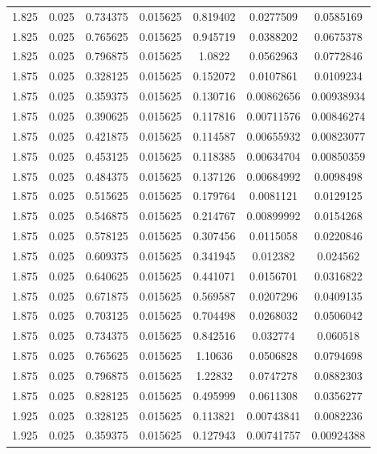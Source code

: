 \begin{table}[bh]
\begin{center}
{\begin{tabular}{ccccccc}
1.825	 & 0.025 & 	0.734375	 & 0.015625	 & 0.819402	 & 0.0277509	 & 0.0585169 \\ 
1.825	 & 0.025 & 	0.765625	 & 0.015625	 & 0.945719	 & 0.0388202	 & 0.0675378 \\ 
1.825	 & 0.025 & 	0.796875	 & 0.015625	 & 1.0822	 & 0.0562963	 & 0.0772846 \\ 
1.875	 & 0.025 & 	0.328125	 & 0.015625	 & 0.152072	 & 0.0107861	 & 0.0109234 \\ 
1.875	 & 0.025 & 	0.359375	 & 0.015625	 & 0.130716	 & 0.00862656	 & 0.00938934 \\ 
1.875	 & 0.025 & 	0.390625	 & 0.015625	 & 0.117816	 & 0.00711576	 & 0.00846274 \\ 
1.875	 & 0.025 & 	0.421875	 & 0.015625	 & 0.114587	 & 0.00655932	 & 0.00823077 \\ 
1.875	 & 0.025 & 	0.453125	 & 0.015625	 & 0.118385	 & 0.00634704	 & 0.00850359 \\ 
1.875	 & 0.025 & 	0.484375	 & 0.015625	 & 0.137126	 & 0.00684992	 & 0.0098498 \\ 
1.875	 & 0.025 & 	0.515625	 & 0.015625	 & 0.179764	 & 0.0081121	 & 0.0129125 \\ 
1.875	 & 0.025 & 	0.546875	 & 0.015625	 & 0.214767	 & 0.00899992	 & 0.0154268 \\ 
1.875	 & 0.025 & 	0.578125	 & 0.015625	 & 0.307456	 & 0.0115058	 & 0.0220846 \\ 
1.875	 & 0.025 & 	0.609375	 & 0.015625	 & 0.341945	 & 0.012382	 & 0.024562 \\ 
1.875	 & 0.025 & 	0.640625	 & 0.015625	 & 0.441071	 & 0.0156701	 & 0.0316822 \\ 
1.875	 & 0.025 & 	0.671875	 & 0.015625	 & 0.569587	 & 0.0207296	 & 0.0409135 \\ 
1.875	 & 0.025 & 	0.703125	 & 0.015625	 & 0.704498	 & 0.0268032	 & 0.0506042 \\ 
1.875	 & 0.025 & 	0.734375	 & 0.015625	 & 0.842516	 & 0.032774	 & 0.060518 \\ 
1.875	 & 0.025 & 	0.765625	 & 0.015625	 & 1.10636	 & 0.0506828	 & 0.0794698 \\ 
1.875	 & 0.025 & 	0.796875	 & 0.015625	 & 1.22832	 & 0.0747278	 & 0.0882303 \\ 
1.875	 & 0.025 & 	0.828125	 & 0.015625	 & 0.495999	 & 0.0611308	 & 0.0356277 \\ 
1.925	 & 0.025 & 	0.328125	 & 0.015625	 & 0.113821	 & 0.00743841	 & 0.0082236 \\ 
1.925	 & 0.025 & 	0.359375	 & 0.015625	 & 0.127943	 & 0.00741757	 & 0.00924388 \\ 

\end{tabular}}
\end{center}
\end{table}
